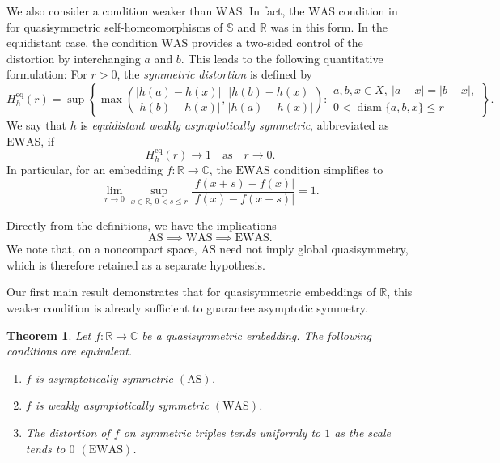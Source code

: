 \documentclass[10pt,a4paper]{amsart}
\numberwithin{equation}{section}
\newtheorem{theorem}{Theorem}[section]
\newcommand{\R}{\mathbb{R}}
\newcommand{\C}{\mathbb{C}}
\newcommand{\diam}{\operatorname{diam}}
\begin{document}
We also consider a condition weaker than $\mathrm{WAS}$. In fact, the $\mathrm{WAS}$ condition in \cite{Car67, GS} for quasisymmetric self-homeomorphisms 
of $\mathbb S$ and $\mathbb R$ was in this form.
In the equidistant case, the condition $\mathrm{WAS}$ provides a two-sided control of the distortion by interchanging $a$ and $b$. 
This leads to the following quantitative formulation:
For $r>0$, the \emph{symmetric distortion} is defined by
\begin{equation*}
 H_h^\mathrm{eq}(r)=\sup\left\{\max\left(\frac{|h(a)-h(x)|}{|h(b)-h(x)|},\frac{|h(b)-h(x)|}{|h(a)-h(x)|}\right):
 \begin{array}{c}
 a,b,x\in X,\ |a-x|=|b-x|,\\
 0<\diam\{a,b,x\}\leq r
 \end{array}
 \right\}.
\end{equation*}
We say that $h$ is \emph{equidistant weakly asymptotically symmetric}, abbreviated as $\mathrm{EWAS}$, if 
\[H_h^\mathrm{eq}(r) \to  1\quad \text{as}\quad r \to 0.\]
In particular, for an embedding $f\colon\R\to\C$,  the $\mathrm{EWAS}$ condition simplifies to
\begin{equation*}
 \lim_{r\to 0}\sup_{x\in\R,\, 0<s\leq r}\frac{|f(x+s)-f(x)|}{|f(x)-f(x-s)|}=1.
\end{equation*}

Directly from the definitions, we have the implications
\[
 \mathrm{AS}\implies\mathrm{WAS}\implies\mathrm{EWAS}.
\]
We note that, on a noncompact space, $\mathrm{AS}$ need not imply global quasisymmetry, which is therefore retained as a separate hypothesis.

Our first main result demonstrates that for quasisymmetric embeddings of $\mathbb{R}$, this weaker condition is already sufficient to guarantee asymptotic symmetry.


\begin{theorem}\label{thm:main-intro}
Let $f\colon\R\to\C$ be a quasisymmetric embedding.  
The following conditions are equivalent.
\begin{enumerate}[label=\textup{(\roman*)}]
\item $f$ is asymptotically symmetric $\mathrm{(AS)}$.
\item $f$ is weakly asymptotically symmetric $\mathrm{(WAS)}$.
\item The distortion of $f$ on symmetric triples tends uniformly to $1$ as the scale tends to $0$ $\mathrm{(EWAS)}$.
\end{enumerate}
\end{theorem}
\end{document}
